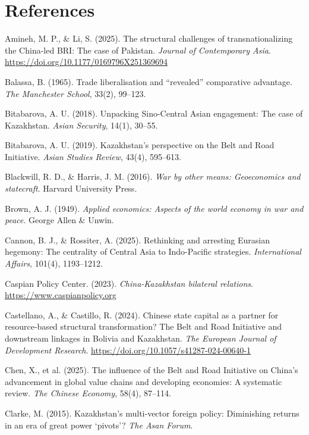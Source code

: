\documentclass[12pt]{article}
\begin{document}
\section*{References}

\begin{flushleft}
Amineh, M. P., \& Li, S. (2025). The structural challenges of transnationalizing the China-led BRI: The case of Pakistan. \textit{Journal of Contemporary Asia}. \url{https://doi.org/10.1177/0169796X251369694}

Balassa, B. (1965). Trade liberalisation and ``revealed'' comparative advantage. \textit{The Manchester School}, 33(2), 99--123.

Bitabarova, A. U. (2018). Unpacking Sino-Central Asian engagement: The case of Kazakhstan. \textit{Asian Security}, 14(1), 30--55.

Bitabarova, A. U. (2019). Kazakhstan's perspective on the Belt and Road Initiative. \textit{Asian Studies Review}, 43(4), 595--613.

Blackwill, R. D., \& Harris, J. M. (2016). \textit{War by other means: Geoeconomics and statecraft}. Harvard University Press.

Brown, A. J. (1949). \textit{Applied economics: Aspects of the world economy in war and peace}. George Allen \& Unwin.

Cannon, B. J., \& Rossiter, A. (2025). Rethinking and arresting Eurasian hegemony: The centrality of Central Asia to Indo-Pacific strategies. \textit{International Affairs}, 101(4), 1193--1212.

Caspian Policy Center. (2023). \textit{China-Kazakhstan bilateral relations}. \url{https://www.caspianpolicy.org}

Castellano, A., \& Castillo, R. (2024). Chinese state capital as a partner for resource-based structural transformation? The Belt and Road Initiative and downstream linkages in Bolivia and Kazakhstan. \textit{The European Journal of Development Research}. \url{https://doi.org/10.1057/s41287-024-00640-1}

Chen, X., et al. (2025). The influence of the Belt and Road Initiative on China's advancement in global value chains and developing economies: A systematic review. \textit{The Chinese Economy}, 58(4), 87--114.

Clarke, M. (2015). Kazakhstan's multi-vector foreign policy: Diminishing returns in an era of great power `pivots'? \textit{The Asan Forum}.


\end{flushleft}
\end{document}
